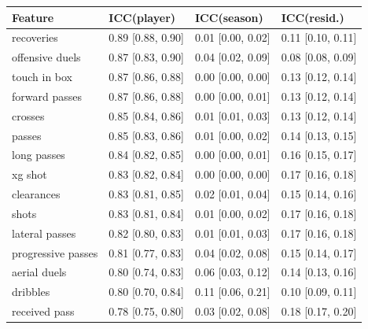 
\begin{tabular}{llll}
\toprule
Feature & ICC(player) & ICC(season) & ICC(resid.)\\
\midrule
recoveries & 0.89 [0.88, 0.90] & 0.01 [0.00, 0.02] & 0.11 [0.10, 0.11]\\
offensive duels & 0.87 [0.83, 0.90] & 0.04 [0.02, 0.09] & 0.08 [0.08, 0.09]\\
touch in box & 0.87 [0.86, 0.88] & 0.00 [0.00, 0.00] & 0.13 [0.12, 0.14]\\
forward passes & 0.87 [0.86, 0.88] & 0.00 [0.00, 0.01] & 0.13 [0.12, 0.14]\\
crosses & 0.85 [0.84, 0.86] & 0.01 [0.01, 0.03] & 0.13 [0.12, 0.14]\\
passes & 0.85 [0.83, 0.86] & 0.01 [0.00, 0.02] & 0.14 [0.13, 0.15]\\
long passes & 0.84 [0.82, 0.85] & 0.00 [0.00, 0.01] & 0.16 [0.15, 0.17]\\
xg shot & 0.83 [0.82, 0.84] & 0.00 [0.00, 0.00] & 0.17 [0.16, 0.18]\\
clearances & 0.83 [0.81, 0.85] & 0.02 [0.01, 0.04] & 0.15 [0.14, 0.16]\\
shots & 0.83 [0.81, 0.84] & 0.01 [0.00, 0.02] & 0.17 [0.16, 0.18]\\
lateral passes & 0.82 [0.80, 0.83] & 0.01 [0.01, 0.03] & 0.17 [0.16, 0.18]\\
progressive passes & 0.81 [0.77, 0.83] & 0.04 [0.02, 0.08] & 0.15 [0.14, 0.17]\\
aerial duels & 0.80 [0.74, 0.83] & 0.06 [0.03, 0.12] & 0.14 [0.13, 0.16]\\
dribbles & 0.80 [0.70, 0.84] & 0.11 [0.06, 0.21] & 0.10 [0.09, 0.11]\\
received pass & 0.78 [0.75, 0.80] & 0.03 [0.02, 0.08] & 0.18 [0.17, 0.20]\\
\bottomrule
\end{tabular}
